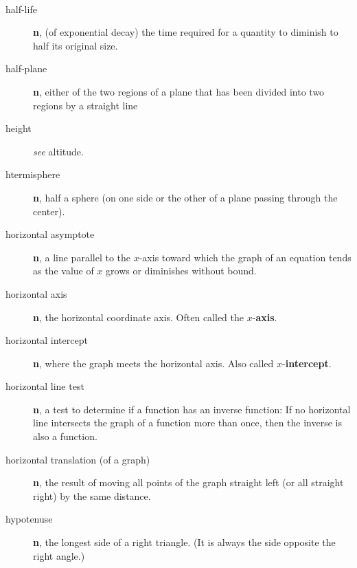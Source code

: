 \documentclass[10pt,]{book}
\newcommand{\terminology}[1]{\textbf{#1}}
\theoremstyle{plain}
\theoremstyle{definition}
\theoremstyle{definition}
\theoremstyle{definition}
\numberwithin{equation}{part}
\begin{document}
\paragraph[{}]{}\hypertarget{paragraphs-12}{}
\leavevmode%
\begin{description}
\item[{half-life}]\hypertarget{li-606}{}\terminology{n}, (of exponential decay) the time required for a quantity to diminish to half its original size.%
\item[{half-plane}]\hypertarget{li-607}{}\terminology{n}, either of the two regions of a plane that has been divided into two regions by a straight line%
\item[{height}]\hypertarget{li-608}{}\emph{see} altitude.%
\item[{htermisphere}]\hypertarget{li-609}{}\terminology{n}, half a sphere (on one side or the other of a plane passing through the center).%
\item[{horizontal asymptote}]\hypertarget{li-610}{}\terminology{n}, a line parallel to the \(x\)-axis toward which the graph of an equation tends as the value of \(x\) grows or diminishes without bound.%
\item[{horizontal axis}]\hypertarget{li-611}{}\terminology{n}, the horizontal coordinate axis. Often called the \(x\)-\terminology{axis}.%
\item[{horizontal intercept}]\hypertarget{li-612}{}\terminology{n}, where the graph meets the horizontal axis. Also called \(x\)-\terminology{intercept}.%
\item[{horizontal line test}]\hypertarget{li-613}{}\terminology{n}, a test to determine if a function has an inverse function: If no horizontal line intersects the graph of a function more than once, then the inverse is also a function.%
\item[{horizontal translation (of a graph)}]\hypertarget{li-614}{}\terminology{n}, the result of moving all points of the graph straight left (or all straight right) by the same distance.%
\item[{hypotenuse}]\hypertarget{li-615}{}\terminology{n}, the longest side of a right triangle. (It is always the side opposite the right angle.)%
\end{description}
%
\typeout{************************************************}
\typeout{************************************************}
\end{document}
